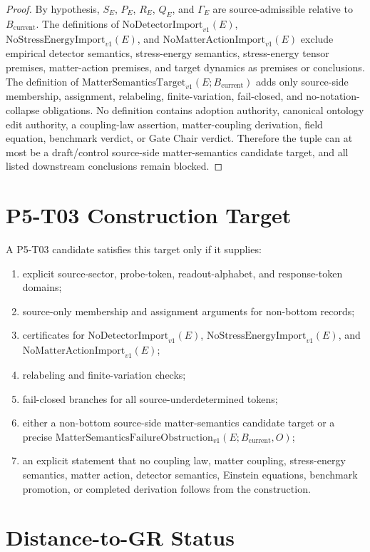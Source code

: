 \documentclass[11pt]{article}
\newcommand{\Bcur}{B_{\mathrm{current}}}
\newcommand{\NoSE}{\mathrm{NoStressEnergyImport}_{v1}}
\newcommand{\NoAction}{\mathrm{NoMatterActionImport}_{v1}}
\newcommand{\NoDetector}{\mathrm{NoDetectorImport}_{v1}}
\newcommand{\FailureObs}{\mathrm{MatterSemanticsFailureObstruction}_{v1}}
\newcommand{\Target}{\mathrm{MatterSemanticsTarget}_{v1}}
\begin{document}
\begin{proof}
By hypothesis, \(S_E\), \(P_E\), \(R_E\), \(Q_E\), and \(\Gamma_E\) are
source-admissible relative to \(\Bcur\). The definitions of
\(\NoDetector(E)\), \(\NoSE(E)\), and \(\NoAction(E)\) exclude empirical
detector semantics, stress-energy semantics, stress-energy tensor premises,
matter-action premises, and target dynamics as premises or conclusions. The
definition of \(\Target(E;\Bcur)\) adds only source-side membership,
assignment, relabeling, finite-variation, fail-closed, and no-notation-collapse
obligations. No definition contains adoption authority, canonical ontology
edit authority, a coupling-law assertion, matter-coupling derivation, field
equation, benchmark verdict, or Gate Chair verdict. Therefore the tuple can at
most be a draft/control source-side matter-semantics candidate target, and all
listed downstream conclusions remain blocked.
\end{proof}

\section{P5-T03 Construction Target}

A P5-T03 candidate satisfies this target only if it supplies:
\begin{enumerate}[leftmargin=*]
\item explicit source-sector, probe-token, readout-alphabet, and response-token
  domains;
\item source-only membership and assignment arguments for non-bottom records;
\item certificates for \(\NoDetector(E)\), \(\NoSE(E)\), and \(\NoAction(E)\);
\item relabeling and finite-variation checks;
\item fail-closed branches for all source-underdetermined tokens;
\item either a non-bottom source-side matter-semantics candidate target or a
  precise \(\FailureObs(E;\Bcur,O)\);
\item an explicit statement that no coupling law, matter coupling,
  stress-energy semantics, matter action, detector semantics, Einstein
  equations, benchmark promotion, or completed derivation follows from the
  construction.
\end{enumerate}

\section{Distance-to-GR Status}
\end{document}
